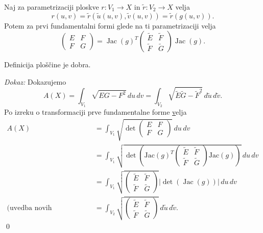 \begin{izrek}
\label{izr_transformacija_1_forme}
  Naj za parametrizaciji ploskve $r: V_1 \to  X$ in $\tilde{r}: V_2 \to X$ velja 
  \begin{equation*} r(u,v) = \tilde{r}(\tilde{u}(u,v), \tilde{v}(u,v)) = \tilde{r}(g(u,v)).\end{equation*}
  Potem za prvi fundamentalni formi glede na ti parametrizaciji velja 
  \begin{equation*} \begin{pmatrix}
  E & F \\
  F & G
  \end{pmatrix} = \operatorname{Jac}(g)^{T}
  \begin{pmatrix}
    \tilde{E} & \tilde{F} \\
    \tilde{F} & \tilde{G}
    \end{pmatrix}
  \operatorname{Jac}(g). \end{equation*}
\end{izrek}

\begin{posledica}
\label{psl_dobra_definiranost_ploscine}
 Definicija ploščine \href{def_ploscina_plosvke} je dobra.
\end{posledica}
\noindent
{\em Dokaz:\/}
 Dokazujemo 
 \begin{equation*} A(X) = \int_{V_1} \sqrt{EG - F^2}   \, du \, dv = \int_{V_2}  \sqrt{\tilde{E}\tilde{G} -  \tilde{F}^2}  \, d \tilde{u} \, d \tilde{v}.\end{equation*}
 Po izreku o transformaciji prve fundamentalne forme \href{izr_transformacija_1_forme} velja 
 \begin{align*}
     A(X) &= \int_{V_1} \sqrt{\det \begin{pmatrix}
     E & F \\
     F & G
     \end{pmatrix}}   \, du \, dv \\
      &= \int_{V_1}  \sqrt{\det \left( \text{Jac}(g)^{T}
      \begin{pmatrix}
        \tilde{E} & \tilde{F} \\
        \tilde{F} & \tilde{G}
        \end{pmatrix}
      \text{Jac}(g) \right) }   \, du \, dv \\ 
      &= \int_{V_1} \sqrt{\begin{pmatrix}
        \tilde{E} & \tilde{F} \\
        \tilde{F} & \tilde{G}
      \end{pmatrix}} \left| \det \left( \operatorname{Jac}(g) \right) \right|  \, du \, dv \\ 
     \text{(uvedba novih spremenljivk)} &= \int_{V_2} \sqrt{\begin{pmatrix}
      \tilde{E} & \tilde{F} \\
      \tilde{F} & \tilde{G}
      \end{pmatrix}}   \, d \tilde{u} \, d \tilde{v}.  
 \end{align*}
\qed

